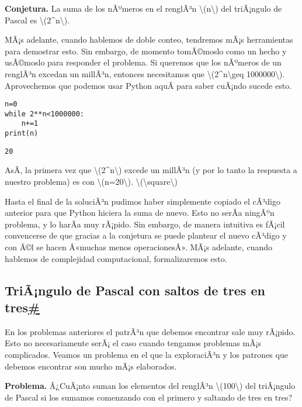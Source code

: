 \documentclass[
]{article}
\begin{document}
\textbf{Conjetura.} La suma de los nÃºmeros en el renglÃ³n
{\textbackslash(n\textbackslash)} del triÃ¡ngulo de Pascal es
{\textbackslash(2\^{}n\textbackslash)}.

MÃ¡s adelante, cuando hablemos de doble conteo, tendremos mÃ¡s
herramientas para demostrar esto. Sin embargo, de momento tomÃ©moslo
como un hecho y usÃ©moslo para responder el problema. Si queremos que
los nÃºmeros de un renglÃ³n excedan un millÃ³n, entonces necesitamos que
{\textbackslash(2\^{}n\textbackslash geq 1000000\textbackslash)}.
Aprovechemos que podemos usar Python aquÃ­ para saber cuÃ¡ndo sucede
esto.

\begin{verbatim}
n=0
while 2**n<1000000:
    n+=1
print(n)
\end{verbatim}

\begin{verbatim}
20
\end{verbatim}

AsÃ­, la primera vez que {\textbackslash(2\^{}n\textbackslash)} excede un
millÃ³n (y por lo tanto la respuesta a nuestro problema) es con
{\textbackslash(n=20\textbackslash)}.
{{\textbackslash(\textbackslash square\textbackslash)}}

Hasta el final de la soluciÃ³n pudimos haber simplemente copiado el
cÃ³digo anterior para que Python hiciera la suma de nuevo. Esto no serÃ­a
ningÃºn problema, y lo harÃ­a muy rÃ¡pido. Sin embargo, de manera
intuitiva es fÃ¡cil convencerse de que gracias a la conjetura se puede
plantear el nuevo cÃ³digo y con Ã©l se hacen Â«muchas menos
operacionesÂ». MÃ¡s adelante, cuando hablemos de complejidad
computacional, formalizaremos esto.

\label{triangulo-de-pascal-con-saltos-de-tres-en-tres}
\subsection{\texorpdfstring{TriÃ¡ngulo de Pascal con saltos de tres en
tres\hyperref[triangulo-de-pascal-con-saltos-de-tres-en-tres]{\#}}{TriÃ¡ngulo de Pascal con saltos de tres en tres\#}}\label{triuxe3ngulo-de-pascal-con-saltos-de-tres-en-tres}

En los problemas anteriores el patrÃ³n que debemos encontrar sale muy
rÃ¡pido. Esto no necesariamente serÃ¡ el caso cuando tengamos problemas
mÃ¡s complicados. Veamos un problema en el que la exploraciÃ³n y los
patrones que debemos encontrar son mucho mÃ¡s elaborados.

\textbf{Problema.} Â¿CuÃ¡nto suman los elementos del renglÃ³n
{\textbackslash(100\textbackslash)} del triÃ¡ngulo de Pascal si los
sumamos comenzando con el primero y saltando de tres en tres?
\end{document}
